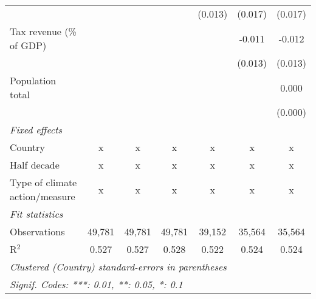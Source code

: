 \begin{tabular}{lcccccc}
                                                        &         &              &               & (0.013)       & (0.017)       & (0.017)\\   
   Tax revenue (\% of GDP)                              &         &              &               &               & -0.011        & -0.012\\   
                                                        &         &              &               &               & (0.013)       & (0.013)\\   
   Population total                                     &         &              &               &               &               & 0.000\\   
                                                        &         &              &               &               &               & (0.000)\\   
   \emph{Fixed effects}\\
   Country                                              & x       & x            & x             & x             & x             & x\\  
   Half decade                                          & x       & x            & x             & x             & x             & x\\  
   Type of climate action/measure                       & x       & x            & x             & x             & x             & x\\  
   \midrule \emph{Fit statistics}\\
   Observations                                         & 49,781  & 49,781       & 49,781        & 39,152        & 35,564        & 35,564\\  
   R$^2$                                                & 0.527   & 0.527        & 0.528         & 0.522         & 0.524         & 0.524\\  
   \midrule
   \multicolumn{7}{l}{\emph{Clustered (Country) standard-errors in parentheses}}\\
   \multicolumn{7}{l}{\emph{Signif. Codes: ***: 0.01, **: 0.05, *: 0.1}}\\
\end{tabular}
\par\endgroup


